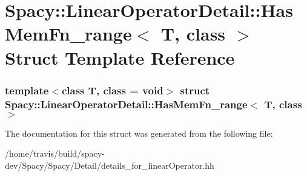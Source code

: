 \hypertarget{structSpacy_1_1LinearOperatorDetail_1_1HasMemFn__range}{\section{\-Spacy\-:\-:\-Linear\-Operator\-Detail\-:\-:\-Has\-Mem\-Fn\-\_\-range$<$ \-T, class $>$ \-Struct \-Template \-Reference}
\label{structSpacy_1_1LinearOperatorDetail_1_1HasMemFn__range}
}
\subsubsection*{template$<$class T, class = void$>$ struct Spacy\-::\-Linear\-Operator\-Detail\-::\-Has\-Mem\-Fn\-\_\-range$<$ T, class $>$}



\-The documentation for this struct was generated from the following file\-:\begin{DoxyCompactItemize}
\item 
/home/travis/build/spacy-\/dev/\-Spacy/\-Spacy/\-Detail/details\-\_\-for\-\_\-linear\-Operator.\-hh\end{DoxyCompactItemize}

